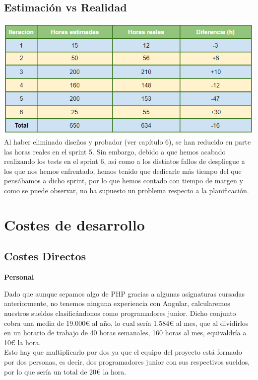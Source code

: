 \clearpage

\subsection{Estimación vs Realidad}

\includegraphics[width=\textwidth]{img/cap4/analisistiempo.png}\\

Al haber eliminado diseños y probador (ver capítulo 6), se han reducido en parte las horas reales en el sprint 5. Sin embargo, debido a que hemos acabado realizando los tests en el sprint 6, así como a los distintos fallos de despliegue a los que nos hemos enfrentado, hemos tenido que dedicarle más tiempo del que pensábamos a dicho sprint, por lo que hemos contado con tiempo de margen y como se puede observar, no ha supuesto un problema respecto a la planificación.

\section{Costes de desarrollo}
	
\subsection{Costes Directos}	

\textbf{Personal}

Dado que aunque sepamos algo de PHP gracias a algunas asignaturas cursadas anteriormente, no tenemos ninguna experiencia con Angular, calcularemos nuestros sueldos clasificándonos como programadores junior. Dicho conjunto cobra una media de 19.000€ al año, lo cual sería 1.584€ al mes, que al dividirlos en un horario de trabajo de 40 horas semanales, 160 horas al mes, equivaldría a 10€ la hora.\\

Esto hay que multiplicarlo por dos ya que el equipo del proyecto está formado por dos personas, es decir, dos programadores junior con sus respectivos sueldos, por lo que sería un total de 20€ la hora.\\


